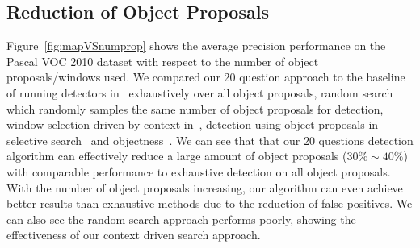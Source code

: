 \subsection{Reduction of Object Proposals} 
Figure~\ref{fig:mapVSnumprop} shows the average precision performance on the Pascal VOC 2010 dataset with respect to the number of object proposals/windows used. We compared our 20 question approach to the baseline of running detectors in~\cite{BharathECCV2014} exhaustively over all object proposals,  random search which randomly samples the same number of object proposals for detection,  window selection driven by context in~\cite{bogdan2012context}, detection using object proposals in selective search~\cite{van2011segmentation} and objectness~\cite{alexe2010object}. We can see that that our 20 questions detection algorithm can effectively reduce a large amount of object proposals ($30\% \sim 40\%$) with comparable performance to exhaustive detection on all object proposals. With the number of object proposals increasing, our algorithm can even achieve better results than exhaustive methods due to the reduction of false positives. We can also see the random search approach performs poorly, showing the effectiveness of our context driven search approach.

